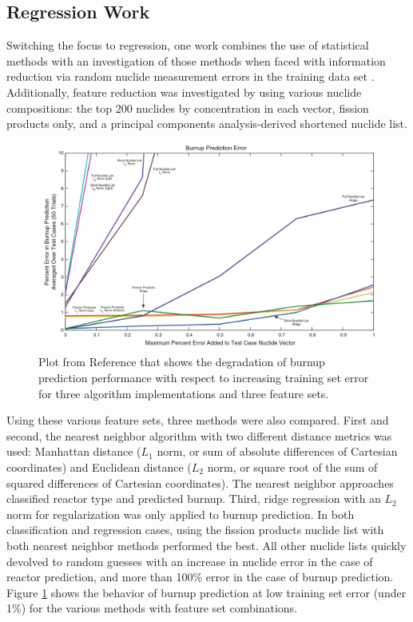 \subsection{Regression Work}

Switching the focus to regression, one work combines the use of statistical
methods with an investigation of those methods when faced with information
reduction via random nuclide measurement errors in the training data set
\cite{dayman_feasibility_2013}.  Additionally, feature reduction was
investigated by using various nuclide compositions: the top 200 nuclides by
concentration in each vector, fission products only, and a principal components
analysis-derived shortened nuclide list.  

\begin{figure}[!htb]
  \centering
  \includegraphics[width=\linewidth]{./chapters/litrev/dayman.png}
  \caption[Burnup performance with respect to training set error]
          {Plot from Reference \cite{dayman_feasibility_2013} that shows the 
           degradation of burnup prediction performance with respect to 
           increasing training set error for three algorithm implementations 
           and three feature sets.}
  \label{fig:dayman}
\end{figure}

Using these various feature sets, three methods were also compared. First and
second, the nearest neighbor algorithm with two different distance metrics was
used: Manhattan distance ($L_1$ norm, or sum of absolute differences of
Cartesian coordinates) and Euclidean distance ($L_2$ norm, or square root of
the sum of squared differences of Cartesian coordinates).  The nearest neighbor
approaches classified reactor type and predicted burnup.  Third, ridge
regression with an $L_2$ norm for regularization was only applied to burnup
prediction.  In both classification and regression cases, using the fission
products nuclide list with both nearest neighbor methods performed the best.
All other nuclide lists quickly devolved to random guesses with an increase in
nuclide error in the case of reactor prediction, and more than 100\% error in
the case of burnup prediction. Figure \ref{fig:dayman} shows the behavior of
burnup prediction at low training set error (under 1\%) for the various methods
with feature set combinations.

